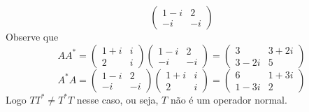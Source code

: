 \documentclass[11pt,a4paper]{article}
\begin{document}
{\[\begin{pmatrix}
1-i & 2\\
-i & -i
\end{pmatrix}\]
Observe que
\[AA^{*} = \begin{pmatrix}
1+i & i \\
2 & i
\end{pmatrix}\begin{pmatrix}
1-i & 2\\
-i & -i
\end{pmatrix} = \begin{pmatrix}
3 & 3 +2i\\
3-2i & 5
\end{pmatrix}
\]
\[
A^{*}A = 
\begin{pmatrix}
1-i & 2\\
-i & -i
\end{pmatrix} \begin{pmatrix}
1+i & i \\
2 & i
\end{pmatrix} =
\begin{pmatrix}
6 & 1+3i\\
1-3i & 2
\end{pmatrix}
\]
Logo $TT^{*} \neq T^{*}T$ nesse caso, ou seja, $T$ não é um operador normal.
}
\end{document}
